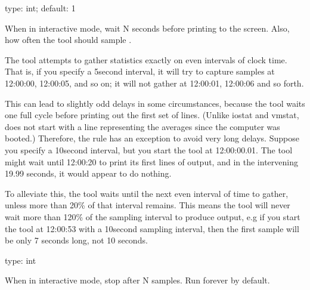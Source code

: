 \documentclass[letterpaper,10pt,english]{sphinxmanual}
\begin{document}
\begin{fulllineitems}
\label{\detokenize{mariadb-iostat:cmdoption-mariadb-iostat-interval}}
\sphinxAtStartPar
type: int; default: 1

\sphinxAtStartPar
When in interactive mode, wait N seconds before printing to the screen.
Also, how often the tool should sample .

\sphinxAtStartPar
The tool attempts to gather statistics exactly on even intervals of clock time.
That is, if you specify a 5\sphinxhyphen{}second interval, it will try to capture samples at
12:00:00, 12:00:05, and so on; it will not gather at 12:00:01, 12:00:06 and so
forth.

\sphinxAtStartPar
This can lead to slightly odd delays in some circumstances, because the tool
waits one full cycle before printing out the first set of lines. (Unlike iostat
and vmstat,  does not start with a line representing the averages
since the computer was booted.)  Therefore, the rule has an exception to avoid
very long delays.  Suppose you specify a 10\sphinxhyphen{}second interval, but you start the
tool at 12:00:00.01.  The tool might wait until 12:00:20 to print its first
lines of output, and in the intervening 19.99 seconds, it would appear to do
nothing.

\sphinxAtStartPar
To alleviate this, the tool waits until the next even interval of time to
gather, unless more than 20\% of that interval remains.  This means the tool will
never wait more than 120\% of the sampling interval to produce output, e.g if you
start the tool at 12:00:53 with a 10\sphinxhyphen{}second sampling interval, then the first
sample will be only 7 seconds long, not 10 seconds.

\end{fulllineitems}


\begin{fulllineitems}
\label{\detokenize{mariadb-iostat:cmdoption-mariadb-iostat-iterations}}
\sphinxAtStartPar
type: int

\sphinxAtStartPar
When in interactive mode, stop after N samples.  Run forever by default.

\end{fulllineitems}
\end{document}
